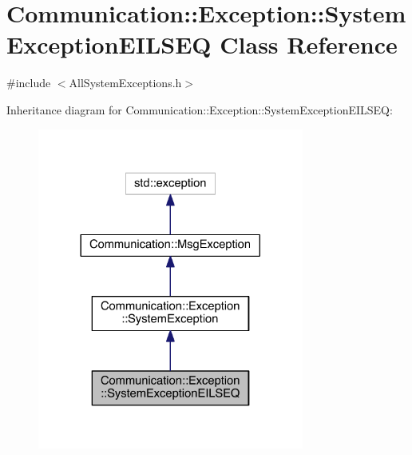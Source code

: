 \hypertarget{class_communication_1_1_exception_1_1_system_exception_e_i_l_s_e_q}{}\section{Communication\+:\+:Exception\+:\+:System\+Exception\+E\+I\+L\+S\+E\+Q Class Reference}
\label{class_communication_1_1_exception_1_1_system_exception_e_i_l_s_e_q}


{\ttfamily \#include $<$All\+System\+Exceptions.\+h$>$}



Inheritance diagram for Communication\+:\+:Exception\+:\+:System\+Exception\+E\+I\+L\+S\+E\+Q\+:\nopagebreak
\begin{figure}[H]
\begin{center}
\leavevmode
\includegraphics[width=248pt]{class_communication_1_1_exception_1_1_system_exception_e_i_l_s_e_q__inherit__graph}
\end{center}
\end{figure}


